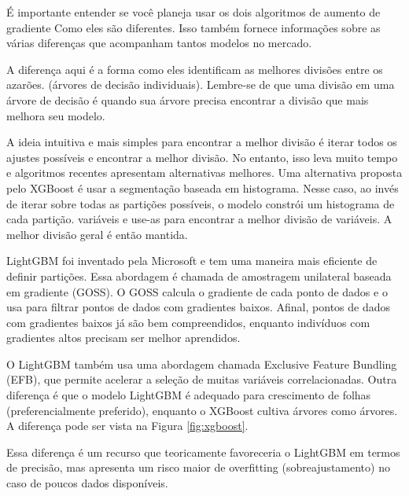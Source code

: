 É importante entender se você planeja usar os dois algoritmos de aumento de gradiente
Como eles são diferentes. Isso também fornece informações sobre as várias diferenças que acompanham tantos modelos no mercado.

A diferença aqui é a forma como eles identificam as melhores divisões entre os azarões. (árvores de decisão individuais). Lembre-se de que uma divisão em uma árvore de decisão é quando sua árvore precisa encontrar a divisão que mais melhora seu modelo.

A ideia intuitiva e mais simples para encontrar a melhor divisão é iterar todos os ajustes possíveis e encontrar a melhor divisão. No entanto, isso leva muito tempo e algoritmos recentes apresentam alternativas melhores.
Uma alternativa proposta pelo XGBoost é usar a segmentação baseada em histograma. Nesse caso, ao invés de iterar sobre todas as partições possíveis, o modelo constrói um histograma de cada partição.
variáveis e use-as para encontrar a melhor divisão de variáveis. A melhor divisão geral é então mantida.

LightGBM foi inventado pela Microsoft e tem uma maneira mais eficiente de definir partições. Essa abordagem é chamada de amostragem unilateral baseada em gradiente (GOSS). O GOSS calcula o gradiente de cada ponto de dados e o usa para filtrar pontos de dados com gradientes baixos. Afinal, pontos de dados com gradientes baixos já são bem compreendidos, enquanto indivíduos com gradientes altos precisam ser melhor aprendidos.

O LightGBM também usa uma abordagem chamada Exclusive Feature Bundling (EFB), que permite acelerar a seleção de muitas variáveis correlacionadas. Outra diferença é que o modelo LightGBM é adequado para crescimento de folhas (preferencialmente preferido), enquanto o XGBoost cultiva árvores como árvores. A diferença pode ser vista na Figura \ref{fig:xgboost}.

Essa diferença é um recurso que teoricamente favoreceria o LightGBM em termos de precisão, mas apresenta um risco maior de overfitting (sobreajustamento) no caso de poucos dados disponíveis.

